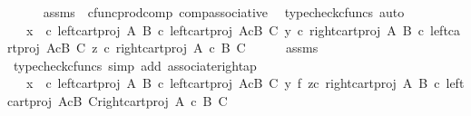 \begin{isabellebody}
\ \ \ \ \isamarkupfalse%
\ assms\ \ cfunc{\isacharunderscore}{\kern0pt}prod{\isacharunderscore}{\kern0pt}comp\ comp{\isacharunderscore}{\kern0pt}associative{}\ \isamarkupfalse%
\ {\isacharparenleft}{\kern0pt}typecheck{\isacharunderscore}{\kern0pt}cfuncs{\isacharcomma}{\kern0pt}\ auto{\isacharparenright}{\kern0pt}\isanewline
\ \ \isamarkupfalse%
\ \isamarkupfalse%
\ {\isachardoublequoteopen}{\isachardot}{\kern0pt}{\isachardot}{\kern0pt}{\isachardot}{\kern0pt}\ {\isacharequal}{\kern0pt}\ {\isasymlangle}x\ \ {\isasymcirc}\isactrlsub c\ left{\isacharunderscore}{\kern0pt}cart{\isacharunderscore}{\kern0pt}proj\ A\ B\ {\isasymcirc}\isactrlsub c\ left{\isacharunderscore}{\kern0pt}cart{\isacharunderscore}{\kern0pt}proj\ {\isacharparenleft}{\kern0pt}A{\isasymtimes}\isactrlsub cB{\isacharparenright}{\kern0pt}\ C{\isacharcomma}{\kern0pt}\ {\isasymlangle}y\ {\isasymcirc}\isactrlsub c\ right{\isacharunderscore}{\kern0pt}cart{\isacharunderscore}{\kern0pt}proj\ A\ B\ {\isasymcirc}\isactrlsub c\ left{\isacharunderscore}{\kern0pt}cart{\isacharunderscore}{\kern0pt}proj\ {\isacharparenleft}{\kern0pt}A{\isasymtimes}\isactrlsub cB{\isacharparenright}{\kern0pt}\ C{\isacharcomma}{\kern0pt}\ z\ {\isasymcirc}\isactrlsub c\ right{\isacharunderscore}{\kern0pt}cart{\isacharunderscore}{\kern0pt}proj\ {\isacharparenleft}{\kern0pt}A\ {\isasymtimes}\isactrlsub c\ B{\isacharparenright}{\kern0pt}\ C{\isasymrangle}{\isasymrangle}{\isachardoublequoteclose}\isanewline
\ \ \ \ \isamarkupfalse%
\ assms\ \isamarkupfalse%
\ {\isacharparenleft}{\kern0pt}typecheck{\isacharunderscore}{\kern0pt}cfuncs{\isacharcomma}{\kern0pt}\ simp\ add{\isacharcolon}{\kern0pt}\ associate{\isacharunderscore}{\kern0pt}right{\isacharunderscore}{\kern0pt}ap{\isacharparenright}{\kern0pt}\isanewline
\ \ \isamarkupfalse%
\ \isamarkupfalse%
\ {\isachardoublequoteopen}{\isachardot}{\kern0pt}{\isachardot}{\kern0pt}{\isachardot}{\kern0pt}\ {\isacharequal}{\kern0pt}\ {\isasymlangle}x\ \ {\isasymcirc}\isactrlsub c\ left{\isacharunderscore}{\kern0pt}cart{\isacharunderscore}{\kern0pt}proj\ A\ B\ {\isasymcirc}\isactrlsub c\ left{\isacharunderscore}{\kern0pt}cart{\isacharunderscore}{\kern0pt}proj\ {\isacharparenleft}{\kern0pt}A{\isasymtimes}\isactrlsub cB{\isacharparenright}{\kern0pt}\ C{\isacharcomma}{\kern0pt}\ {\isacharparenleft}{\kern0pt}y\ {\isasymtimes}\isactrlsub f\ z{\isacharparenright}{\kern0pt}{\isasymcirc}\isactrlsub c\ {\isasymlangle}right{\isacharunderscore}{\kern0pt}cart{\isacharunderscore}{\kern0pt}proj\ A\ B\ {\isasymcirc}\isactrlsub c\ left{\isacharunderscore}{\kern0pt}cart{\isacharunderscore}{\kern0pt}proj\ {\isacharparenleft}{\kern0pt}A{\isasymtimes}\isactrlsub cB{\isacharparenright}{\kern0pt}\ C{\isacharcomma}{\kern0pt}right{\isacharunderscore}{\kern0pt}cart{\isacharunderscore}{\kern0pt}proj\ {\isacharparenleft}{\kern0pt}A\ {\isasymtimes}\isactrlsub c\ B{\isacharparenright}{\kern0pt}\ C{\isasymrangle}{\isasymrangle}{\isachardoublequoteclose}\isanewline

\end{isabellebody}
